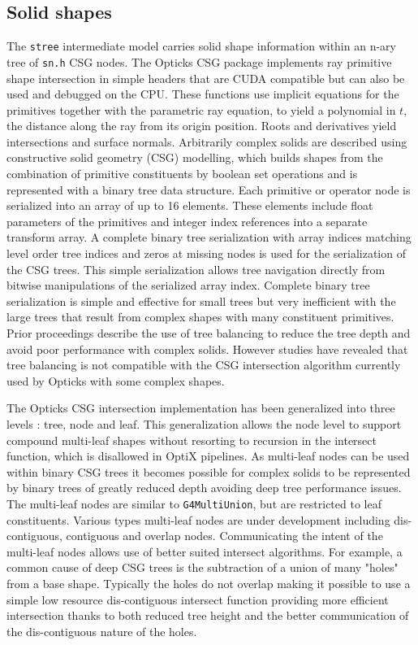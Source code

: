 \documentclass{webofc}
\begin{document}
\subsection{Solid shapes}%
%
The {\tt stree} intermediate model carries solid shape information
within an n-ary tree of {\tt sn.h} CSG nodes. 
%
The Opticks CSG package implements ray primitive shape intersection in simple headers that 
are CUDA compatible but can also be used and debugged on the CPU.
These functions use implicit equations for the primitives together with 
the parametric ray equation, to yield a polynomial in $t$, the distance along the ray from its origin position. 
Roots and derivatives yield intersections and surface normals.
%
Arbitrarily complex solids are described using constructive solid geometry (CSG) modelling, 
which builds shapes from the combination of primitive constituents by boolean set operations
and is represented with a binary tree data structure.
%
Each primitive or operator node is serialized into an array of up to 16 elements. 
These elements include float parameters of the primitives and integer index references 
into a separate transform array. 
A complete binary tree serialization with array indices matching level order tree indices
and zeros at missing nodes is used for the serialization of the CSG trees. This simple 
serialization allows tree navigation directly from bitwise manipulations of the serialized array index.
%
%
Complete binary tree serialization is simple and effective for small trees but very inefficient 
with the large trees that result from complex shapes with many constituent primitives. 
Prior proceedings\cite{chep2018} describe the use of tree balancing to reduce the  
tree depth and avoid poor performance with complex solids. However studies have revealed that 
tree balancing is not compatible with the CSG intersection algorithm currently used by Opticks
with some complex shapes. 

The Opticks CSG intersection implementation has been generalized into three levels : 
tree, node and leaf. This generalization allows the node level to support compound 
multi-leaf shapes without resorting to recursion in the intersect function, which is disallowed in OptiX pipelines. 
As multi-leaf nodes can be used within binary CSG trees it becomes possible for complex solids to 
be represented by binary trees of greatly reduced depth avoiding deep tree performance issues.
The multi-leaf nodes are similar to {\tt G4MultiUnion}, but are restricted to leaf constituents.   
Various types multi-leaf nodes are under development including dis-contiguous, contiguous and overlap nodes.
Communicating the intent of the multi-leaf nodes allows use of better suited intersect algorithms.
For example, a common cause of deep CSG trees is the subtraction of a union of many "holes" 
from a base shape. Typically the holes do not overlap making it possible to 
use a simple low resource dis-contiguous intersect function providing more efficient 
intersection thanks to both reduced tree height and the better communication of the 
dis-contiguous nature of the holes. 
\end{document}
